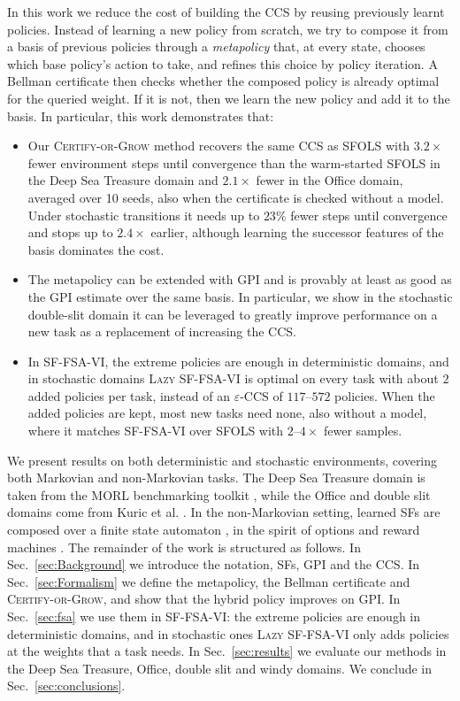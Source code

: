 \documentclass[11pt]{article}
\begin{document}
In this work we reduce the cost of building the CCS by reusing previously learnt policies. Instead of learning a new policy from scratch, we try to compose it from a basis of previous policies through a \emph{metapolicy} that, at every state, chooses which base policy's action to take, and refines this choice by policy iteration. A Bellman certificate then checks whether the composed policy is already optimal for the queried weight. If it is not, then we learn the new policy and add it to the basis. In particular, this work demonstrates that:
\begin{itemize}
    \item Our \textsc{Certify-or-Grow} method recovers the same CCS as SFOLS with $3.2\times$ fewer environment steps until convergence than the warm-started SFOLS in the Deep Sea Treasure domain and $2.1\times$ fewer in the Office domain, averaged over 10 seeds, also when the certificate is checked without a model. Under stochastic transitions it needs up to $23\%$ fewer steps until convergence and stops up to $2.4\times$ earlier, although learning the successor features of the basis dominates the cost.
    \item The metapolicy can be extended with GPI and is provably at least as good as the GPI estimate over the same basis. In particular, we show in the stochastic double-slit domain it can be leveraged to greatly improve performance on a new task as a replacement of increasing the CCS.
    \item In SF-FSA-VI, the extreme policies are enough in deterministic domains, and in stochastic domains \textsc{Lazy SF-FSA-VI} is optimal on every task with about $2$ added policies per task, instead of an $\varepsilon$-CCS of $117$--$572$ policies. When the added policies are kept, most new tasks need none, also without a model, where it matches SF-FSA-VI over SFOLS with $2$--$4\times$ fewer samples.
\end{itemize}

We present results on both deterministic and stochastic environments, covering both Markovian and non-Markovian tasks. The Deep Sea Treasure domain is taken from the MORL benchmarking toolkit \cite{felten_toolkit_2023}, while the Office and double slit domains come from Kuric et al. \cite{kuric_planning_2024}. In the non-Markovian setting, learned SFs are composed over a finite state automaton \cite{kuric_planning_2024}, in the spirit of options \cite{sutton_between_1999} and reward machines \cite{li_reward_2024}. The remainder of the work is structured as follows. In Sec.~\ref{sec:Background} we introduce the notation, SFs, GPI and the CCS. In Sec.~\ref{sec:Formalism} we define the metapolicy, the Bellman certificate and \textsc{Certify-or-Grow}, and show that the hybrid policy improves on GPI. In Sec.~\ref{sec:fsa} we use them in SF-FSA-VI: the extreme policies are enough in deterministic domains, and in stochastic ones \textsc{Lazy SF-FSA-VI} only adds policies at the weights that a task needs. In Sec.~\ref{sec:results} we evaluate our methods in the Deep Sea Treasure, Office, double slit and windy domains. We conclude in Sec.~\ref{sec:conclusions}.
\end{document}
